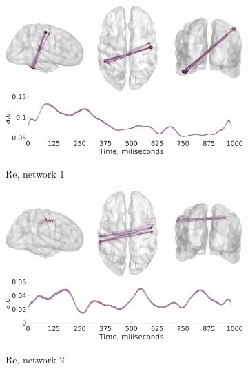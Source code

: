 \begin{figure}
\centering
{}

 \begin{subfigure}[b]{0.4\textwidth}
 \includegraphics[width=\textwidth]{../images/psiicos_paper/Figure12_a1.jpg}
 \includegraphics[width=\textwidth]{../images/psiicos_paper/Figure12_a2.jpg}
 \caption{Re, network 1}\label{fig:12a}
 \end{subfigure}
 \hspace{1cm}
 \begin{subfigure}[b]{0.4\textwidth}
 \includegraphics[width=\textwidth]{../images/psiicos_paper/Figure12_b1.jpg}
 \includegraphics[width=\textwidth]{../images/psiicos_paper/Figure12_b2.jpg}
 \caption{Re, network 2}\label{fig:12b}
 \end{subfigure}
 \begin{subfigure}[b]{0.4\textwidth}

\end{subfigure}
\end{figure}
